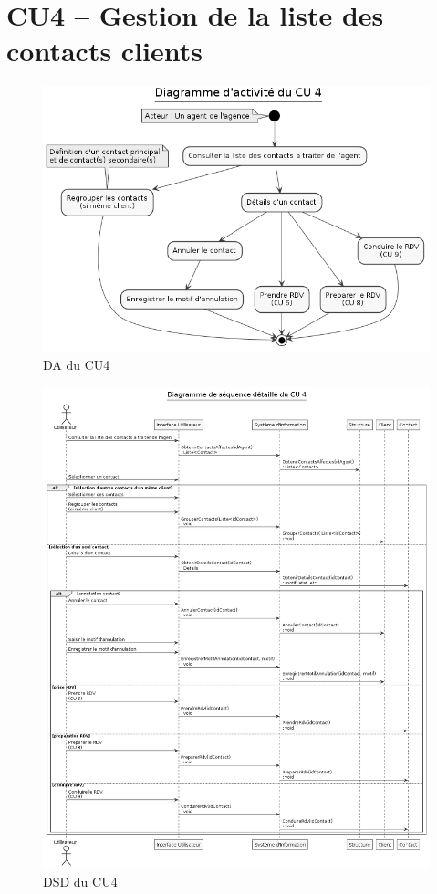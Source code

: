 \clearpage
\section{CU4 – Gestion de la liste des contacts clients}

\begin{figure}[h]
\centering
\includegraphics[width=\textwidth]{figures/DA_CU4.png}
\caption{DA du CU4}
\end{figure}

\begin{figure}[h]
\centering
\includegraphics[width=\textwidth]{figures/DSD_CU4.png}
\caption{DSD du CU4}
\end{figure}

